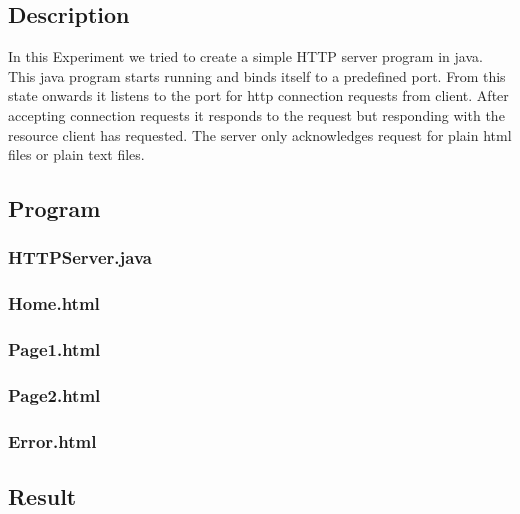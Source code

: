\subsection{Description}
In this Experiment we tried to create a simple HTTP server program in java.
This java program starts running and binds itself to  a predefined port.
From this state onwards it listens to the port for http connection requests from client.
After accepting connection requests it responds to the request but responding with the resource client has requested.
The server only acknowledges request for plain html files or plain text files.

\subsection{Program}
\subsubsection{HTTPServer.java}
\subsubsection{Home.html}
\subsubsection{Page1.html}
\subsubsection{Page2.html}
\subsubsection{Error.html}



\subsection{Result}\result
